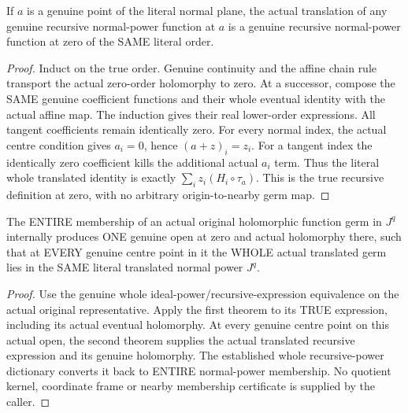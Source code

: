 \begin{theorem}
\label{hir:relative-normal-power-spread-centre-translation}
\leanok
{}
If $a$ is a genuine point of the literal normal plane, the actual
translation of any genuine recursive normal-power function at $a$ is a
genuine recursive normal-power function at zero of the SAME literal order.
\end{theorem}
\begin{proof}
Induct on the true order. Genuine continuity and the affine chain rule
transport the actual zero-order holomorphy to zero. At a successor, compose
the SAME genuine coefficient functions and their whole eventual identity
with the actual affine map. The induction gives their real lower-order
expressions. All tangent coefficients remain identically zero. For every
normal index, the actual centre condition gives $a_i=0$, hence
$(a+z)_i=z_i$. For a tangent index the identically zero coefficient kills
the additional actual $a_i$ term. Thus the literal whole translated identity
is exactly $\sum_i z_i(H_i\circ\tau_a)$. This is the true recursive definition
at zero, with no arbitrary origin-to-nearby germ map.
\end{proof}

\begin{theorem}
\label{hir:relative-normal-power-spread-whole-nearby-membership}
\leanok
{}
The ENTIRE membership of an actual original holomorphic function germ in
$J^q$ internally produces ONE genuine open at zero and actual holomorphy
there, such that at EVERY genuine centre point in it the WHOLE actual
translated germ lies in the SAME literal translated normal power $J^q$.
\end{theorem}
\begin{proof}
Use the genuine whole ideal-power/recursive-expression equivalence on the
actual original representative. Apply the first theorem to its TRUE
expression, including its actual eventual holomorphy. At every genuine
centre point on this actual open, the second theorem supplies the actual
translated recursive expression and its genuine holomorphy. The established
whole recursive-power dictionary converts it back to ENTIRE normal-power
membership. No quotient kernel, coordinate frame or nearby membership
certificate is supplied by the caller.
\end{proof}

